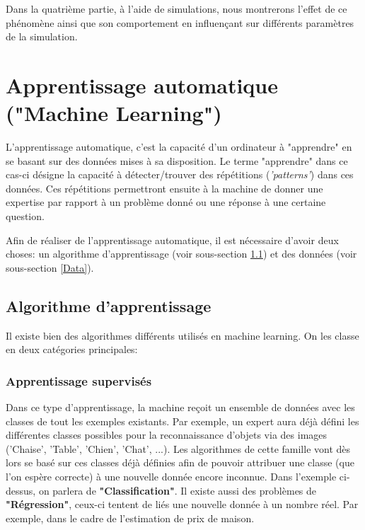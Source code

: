 \documentclass[a4paper]{article}
\begin{document}
Dans la quatrième partie, à l'aide de simulations, nous montrerons l'effet de ce phénomène ainsi que son comportement en influençant sur différents paramètres de la simulation.\newline

\newpage

\section{Apprentissage automatique ("Machine Learning")}

L'apprentissage automatique, c'est la capacité d'un ordinateur à "apprendre" en se basant sur des données mises à sa disposition. Le terme "apprendre" dans ce cas-ci désigne la capacité à détecter/trouver des répétitions (\textit{'patterns'}) dans ces données. Ces répétitions permettront ensuite à la machine de donner une expertise par rapport à un problème donné ou une réponse à une certaine question. \cite{UnderstandingML}\cite{MLPracticalApproach} \newline 

Afin de réaliser de l'apprentissage automatique, il est nécessaire d'avoir deux choses: un algorithme d'apprentissage (voir sous-section \ref{LearningAlgo}) et des données (voir sous-section \ref{Data}).

\subsection{Algorithme d'apprentissage}
\label{LearningAlgo}
Il existe bien des algorithmes différents utilisés en machine learning. On les classe en deux catégories principales:

\subsubsection{Apprentissage supervisés}
Dans ce type d'apprentissage, la machine reçoit un ensemble de données avec les classes de tout les exemples existants.
Par exemple, un expert aura déjà défini les différentes classes possibles pour la reconnaissance d'objets via des images ('Chaise', 'Table', 'Chien', 'Chat', ...). Les algorithmes de cette famille vont dès lors se basé sur ces classes déjà définies afin de pouvoir attribuer une classe (que l'on espère correcte) à une nouvelle donnée encore inconnue. Dans l'exemple ci-dessus, on parlera de \textbf{"Classification"}. \newline
Il existe aussi des problèmes de \textbf{"Régression"}, ceux-ci tentent de liés une nouvelle donnée à un nombre réel. Par exemple, dans le cadre de l'estimation de prix de maison. \newline
\end{document}
